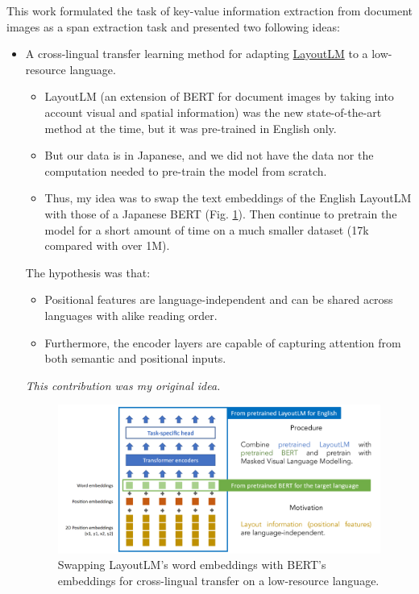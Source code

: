 \documentclass[english,report,10pt]{extarticle}
\begin{document}
This work formulated the task of key-value information extraction from document images as a span extraction task and presented two following ideas:
\begin{itemize}
    \item A cross-lingual transfer learning method for adapting \href{https://arxiv.org/abs/1912.13318}{LayoutLM} to a low-resource language.

          \begin{itemize}
              \item LayoutLM (an extension of BERT for document images by taking into account visual and spatial information) was the new state-of-the-art method at the time, but it was pre-trained in English only.
              \item But our data is in Japanese, and we did not have the data nor the computation needed to pre-train the model from scratch.
              \item Thus, my idea was to swap the text embeddings of the English LayoutLM with those of a Japanese BERT (Fig. \ref{fig:cross-lingual-transfer}). Then continue to pretrain the model for a short amount of time on a much smaller dataset (17k compared with over 1M).
          \end{itemize}

          The hypothesis was that:
          \begin{itemize}
              \item Positional features are language-independent and can be shared across languages with alike reading order.
              \item Furthermore, the encoder layers are capable of capturing attention from both semantic and positional inputs.
          \end{itemize}

          \textit{This contribution was my original idea.}

          \begin{figure}[h!]
              \centering
              \includegraphics[width=14cm]{cross-lingual-transfer.png}
              \caption{Swapping LayoutLM's word embeddings with BERT's embeddings for cross-lingual transfer on a low-resource language.}
              \label{fig:cross-lingual-transfer}
          \end{figure}


\end{itemize}
\end{document}
